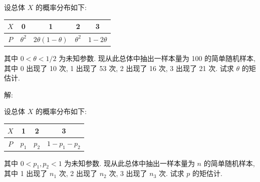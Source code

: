 \documentclass[standard]{ExBook}
\begin{document}
\begin{qitems}
    \begin{bbox}
    \begin{shaded}
        \qitem 
设总体 \( X \) 的概率分布如下:

\begin{center}
\setlength{\tabcolsep}{38pt}
\begin{tabular}{c|cccc}
\hline
\( X \) & 0 & 1 & 2 & 3 \\
\hline
\( P \) & \(\theta^2\) & \(2\theta(1-\theta)\) & \(\theta^2\) & \(1-2\theta\) \\
\hline
\end{tabular}
\end{center}

其中 \( 0 < \theta < 1/2 \) 为未知参数. 现从此总体中抽出一样本量为 100 的简单随机样本, 其中 0 出现了 10 次, 1 出现了 53 次, 2 出现了 16 次, 3 出现了 21 次. 试求 \(\theta\) 的矩估计.
    \end{shaded}
    \end{bbox}

\vspace{-5em}

    \begin{bbox}
解: 
    \end{bbox}

\vspace{-5em}

    \begin{bbox}
    \begin{shaded}
        \qitem
设总体 \( X \) 的概率分布如下:

\begin{center}
\setlength{\tabcolsep}{50.5pt}
\begin{tabular}{c|ccc}
\hline
\( X \) & 1 & 2 & 3 \\
\hline
\( P \) & \( p_1 \) & \( p_2 \) & \( 1-p_1-p_2 \) \\
\hline
\end{tabular}
\end{center}

其中 \( 0 < p_1, p_2 < 1 \) 为未知参数. 现从此总体中抽出一样本量为 \( n \) 的简单随机样本, 其中 1 出现了 \( n_1 \) 次, 2 出现了 \( n_2 \) 次, 3 出现了 \( n_3 \) 次. 试求 \( p \) 的矩估计.
    \end{shaded}
    \end{bbox}

\vspace{-5em}


\end{qitems}
\end{document}
